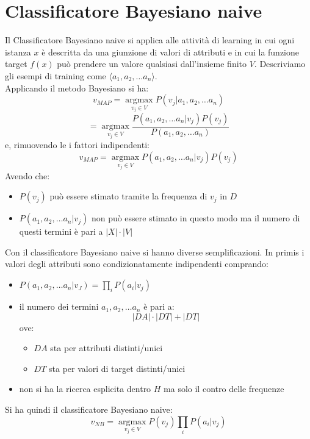 \section{Classificatore Bayesiano naive}
Il Classificatore Bayesiano naive si applica alle attività di learning in
cui ogni istanza $x$ è descritta da una giunzione di valori di attributi e in
cui la funzione target $f(x)$ può prendere un valore qualsiasi dall'insieme
finito $V$. Descriviamo gli esempi di training come $\langle a_1, a_2,\ldots
a_n\rangle $. \\
Applicando il metodo Bayesiano si ha:
\[v_{MAP}=\operatorname*{argmax}_{v_j\in V}P(v_j|a_1, a_2,\ldots a_n)\]
\[=\operatorname*{argmax}_{v_j\in V}\frac{P(a_1, a_2,\ldots
    a_n|v_j)P(v_j)}{P(a_1, a_2,\ldots a_n)}\]
e, rimuovendo le i fattori indipendenti:
\[v_{MAP}=\operatorname*{argmax}_{v_j\in V}P(a_1, a_2,\ldots a_n|v_j)P(v_j)\]
Avendo che:
\begin{itemize}
  \item $P(v_j)$ può essere stimato tramite la frequenza di $v_j$ in $D$
  \item $P(a_1, a_2,\ldots a_n|v_j)$ non può essere stimato in questo modo ma il
  numero di questi termini è pari a $|X|\cdot |V|$
\end{itemize}
Con il classificatore Bayesiano naive si hanno diverse semplificazioni. In primis
i valori degli attributi sono condizionatamente indipendenti comprando:
\begin{itemize}
  \item $P(a_1, a_2,\ldots a_n|v_J)=\prod_iP(a_i|v_j)$
  \item il numero dei termini $a_1, a_2,\ldots a_n$ è pari a:
  \[|DA|\cdot |DT|+|DT|\]
  ove:
  \begin{itemize}
    \item $DA$ sta per attributi distinti/unici
    \item $DT$ sta per valori di target distinti/unici
  \end{itemize}
  \item non si ha la ricerca esplicita dentro $H$ ma solo il contro delle
  frequenze 
\end{itemize}
Si ha quindi il classificatore Bayesiano naive:
\[v_{NB}=\operatorname*{argmax}_{v_j\in V}P(v_j)\prod_iP(a_i|v_j)\]
\newpage
